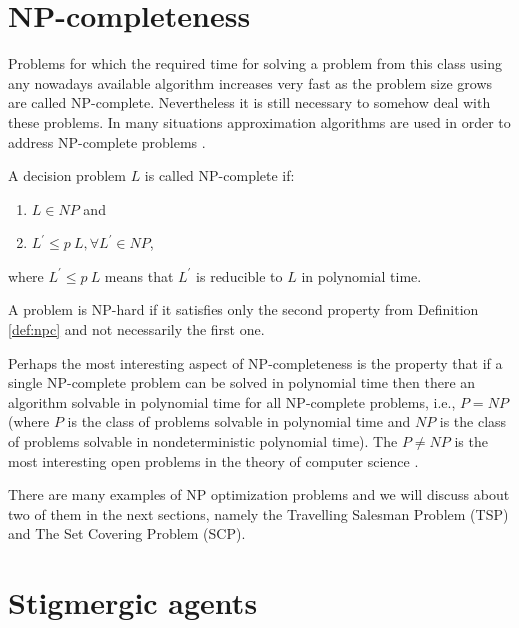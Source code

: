\section{NP-completeness}
\label{sec:np}

Problems for which the required  time for solving a problem from this class using any nowadays available algorithm increases very fast as the problem size grows are called NP-complete.
Nevertheless it is still necessary to somehow deal with these problems. In many situations approximation algorithms are used in order to address NP-complete problems \cite{Cormen09Introduction}.



\begin{definition}
\label{def:npc}
A decision problem $L$ is called NP-complete if:
\begin{enumerate}
\item $L \in NP$ and
\item $L^{'} \leq p~L, \forall L^{'} \in NP$,
\end{enumerate}
where $L^{'} \leq p~L$ means that $L^{'}$ is reducible to $L$ in polynomial time.
\end{definition}

\begin{definition}
A problem is NP-hard if it satisfies only the second property from Definition \ref{def:npc} and not necessarily the first one.
\end{definition}

Perhaps the most interesting aspect of NP-completeness is the property that if a single NP-complete problem can be solved in polynomial time then there an algorithm solvable in  polynomial time for all NP-complete problems, i.e., $P=NP$ (where $P$ is the class of problems solvable in polynomial time and $NP$ is the class of problems solvable  in nondeterministic polynomial time). The $P \neq NP$ is the most interesting open problems in the theory of computer science \cite{Cormen09Introduction}.

There are many examples of NP optimization problems \cite{compediumnp} and we will discuss about two of them in the next sections, namely the Travelling Salesman Problem (TSP) and The Set Covering Problem (SCP).


\section{Stigmergic agents}
\label{sec:stigmergic}

